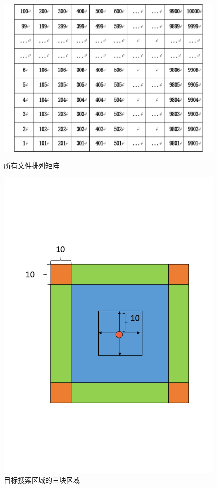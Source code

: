 \documentclass[UTF8]{ctexart}
\begin{document}
\begin{figure}[!htbp]
  \begin{minipage}[t]{0.5\linewidth}
    \centering
    \includegraphics[width=\textwidth]{fig/fig03.pdf}
    \caption{所有文件排列矩阵 \label{sec3:subsec2:fg2}}
  \end{minipage}
  \hfill
  \begin{minipage}[t]{0.45\linewidth}
    \centering
    \includegraphics[width=\textwidth]{fig/fig04.pdf}
    \caption{目标搜索区域的三块区域 \label{sec3:subsec2:fg3}}
  \end{minipage}
\end{figure}
\end{document}
